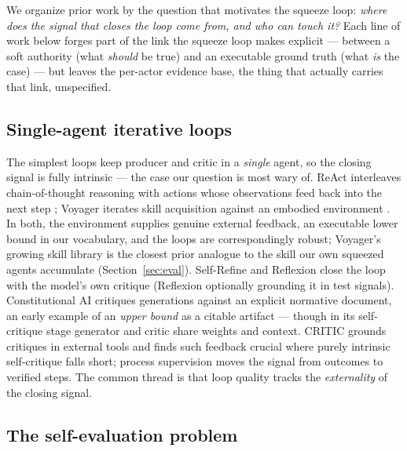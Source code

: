 \documentclass[11pt]{article}
\begin{document}
We organize prior work by the question that motivates the squeeze loop:
\emph{where does the signal that closes the loop come from, and who can touch
it?} Each line of work below forges part of the link the squeeze loop makes
explicit --- between a soft authority (what \emph{should} be true) and an
executable ground truth (what \emph{is} the case) --- but leaves the per-actor
evidence base, the thing that actually carries that link, unspecified.

\subsection{Single-agent iterative loops}

The simplest loops keep producer and critic in a \emph{single} agent, so the closing signal is
fully intrinsic --- the case our question is most wary of. ReAct interleaves chain-of-thought
reasoning with actions whose observations feed back into the next step \citep{yao2022react};
Voyager iterates skill acquisition against an embodied environment \citep{wang2023voyager}. In
both, the environment supplies genuine external feedback, an executable lower bound in our
vocabulary, and the loops are correspondingly robust; Voyager's growing skill library is the
closest prior analogue to the skill our own squeezed agents accumulate (Section~\ref{sec:eval}).
Self-Refine \citep{madaan2023selfrefine} and Reflexion \citep{shinn2023reflexion} close the loop
with the model's own critique (Reflexion optionally grounding it in test signals). Constitutional
AI \citep{bai2022constitutional} critiques generations against an explicit normative document, an
early example of an \emph{upper bound} as a citable artifact --- though in its self-critique
stage generator and critic share weights and context. CRITIC \citep{gou2023critic} grounds
critiques in external tools and finds such feedback crucial where purely intrinsic self-critique
falls short; process supervision \citep{lightman2023verify} moves the signal from outcomes to
verified steps. The common thread is that loop quality tracks the \emph{externality} of the
closing signal.

\subsection{The self-evaluation problem}
\label{sec:selfeval}
\end{document}
